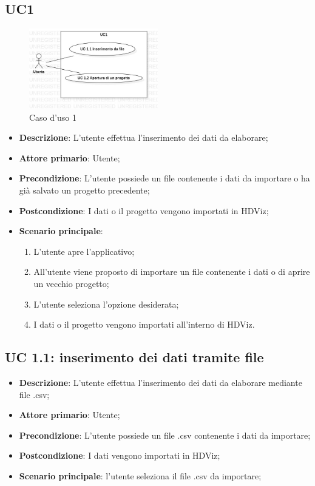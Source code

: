 \subsection{UC1}
\label{sub:uc1}
\begin{figure}[h]
    \centering
    \includegraphics[width=0.5\textwidth]{risorse/img/UC1.jpg}
    \caption{Caso d'uso 1}
    \label{fig:UC1}
\end{figure}
\begin{itemize}
    \item{\textbf{Descrizione}}: L'utente effettua l'inserimento dei dati da elaborare;
    \item{\textbf{Attore primario}}: Utente;
    \item{\textbf{Precondizione}}: L'utente possiede un file contenente i dati da importare o ha già salvato un progetto precedente;
    \item{\textbf{Postcondizione}}: I dati o il progetto vengono importati in HDViz;
    \item{\textbf{Scenario principale}}:
    \begin{enumerate}
        \item L'utente apre l'applicativo;
        \item All'utente viene proposto di importare un file contenente i dati o di aprire un vecchio progetto;
        \item L'utente seleziona l'opzione desiderata;
        \item I dati o il progetto vengono importati all'interno di HDViz.
    \end{enumerate}
\end{itemize}

\subsection{UC 1.1: inserimento dei dati tramite file}
\begin{itemize}
    \item{\textbf{Descrizione}}: L'utente effettua l'inserimento dei dati da elaborare mediante file .csv;
    \item{\textbf{Attore primario}}: Utente;
    \item{\textbf{Precondizione}}: L'utente possiede un file .csv contenente i dati da importare;
    \item{\textbf{Postcondizione}}: I dati vengono importati in HDViz;
    \item{\textbf{Scenario principale}}: l'utente seleziona il file .csv da importare;
\end{itemize}

